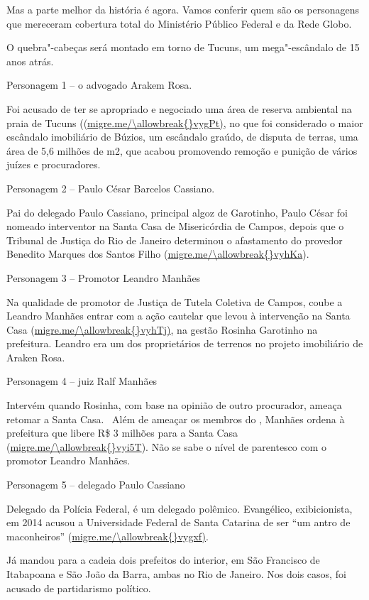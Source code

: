 Mas a parte melhor da história é agora. Vamos conferir quem são os
personagens que mereceram cobertura total do Ministério Público Federal
e da Rede Globo.

O quebra"-cabeças será montado em torno de Tucuns, um mega"-escândalo de
15 anos atrás.

 

Personagem 1 -- o advogado Arakem Rosa.

Foi acusado de ter se apropriado e negociado uma área de reserva
ambiental na praia de Tucuns ((\url{migre.me/\allowbreak{}vygPt)}, no que foi
considerado o maior escândalo imobiliário de Búzios, um escândalo
graúdo, de disputa de terras, uma área de 5,6 milhões de m2, que acabou
promovendo remoção e punição de vários juízes e procuradores.

Personagem 2 -- Paulo César Barcelos Cassiano.

Pai do delegado Paulo Cassiano, principal algoz de Garotinho, Paulo
César foi nomeado interventor na Santa Casa de Misericórdia de Campos,
depois que o Tribunal de Justiça do Rio de Janeiro determinou o
afastamento do provedor Benedito Marques dos Santos Filho
(\url{migre.me/\allowbreak{}vyhKa}).

Personagem 3 -- Promotor Leandro Manhães

Na qualidade de promotor de Justiça de Tutela Coletiva de Campos, coube
a Leandro Manhães entrar com a ação cautelar que levou à intervenção na
Santa Casa (\url{migre.me/\allowbreak{}vyhTj)}, na gestão Rosinha Garotinho na
prefeitura. Leandro era um dos proprietários de terrenos no projeto
imobiliário de Araken Rosa.

Personagem 4 -- juiz Ralf Manhães

Intervém quando Rosinha, com base na opinião de outro procurador, ameaça
retomar a Santa Casa. ~Além de ameaçar os membros do , Manhães ordena
à prefeitura que libere R\$ 3 milhões para a Santa Casa
(\url{migre.me/\allowbreak{}vyi5T}). Não se sabe o nível de parentesco com o
promotor Leandro Manhães.

Personagem 5 -- delegado Paulo Cassiano

Delegado da Polícia Federal, é um delegado polêmico. Evangélico,
exibicionista, em 2014 acusou a Universidade Federal de Santa Catarina
de ser ``um antro de maconheiros'' (\url{migre.me/\allowbreak{}vygxf)}.

Já mandou para a cadeia dois prefeitos do interior, em São Francisco de
Itabapoana e São João da Barra, ambas no Rio de Janeiro. Nos dois casos,
foi acusado de partidarismo político.

